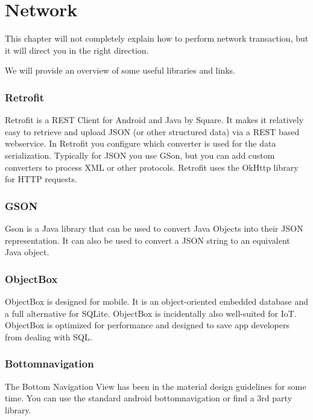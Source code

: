 
\chapter{Network}
This chapter will not completely explain how to perform network transaction, but it will direct you in the right direction. 

We will provide an overview of some useful libraries and links.

\subsection{Retrofit}
Retrofit is a REST Client for Android and Java by Square. It makes it relatively easy to retrieve and upload JSON (or other structured data) via a REST based webservice. In Retrofit you configure which converter is used for the data serialization. Typically for JSON you use GSon, but you can add custom converters to process XML or other protocols. Retrofit uses the OkHttp library for HTTP requests.

\subsection{GSON}
Gson is a Java library that can be used to convert Java Objects into their JSON representation. It can also be used to convert a JSON string to an equivalent Java object. 

\subsection{ObjectBox}
ObjectBox is designed for mobile. It is an object-oriented embedded database and a full alternative for SQLite. ObjectBox is incidentally also well-suited for IoT.
ObjectBox is optimized for performance and designed to save app developers from dealing with SQL.

\subsection{Bottomnavigation}
The Bottom Navigation View has been in the material design guidelines for some time. You can use the standard android bottomnavigation or find a 3rd party library.


